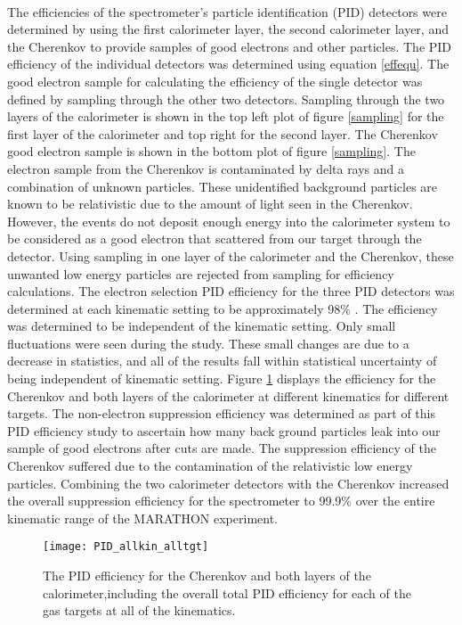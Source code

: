 \paragraph{}The efficiencies of the spectrometer's particle identification (PID) detectors were determined by using the first calorimeter layer, the second calorimeter layer, and the Cherenkov to provide samples of good electrons and other particles. The PID efficiency of the individual detectors was determined using equation \ref{effequ}. The good electron sample for calculating the efficiency of the single detector was defined by sampling through the other two detectors. Sampling through the two layers of the calorimeter is shown in the top left plot of figure \ref{sampling} for the first layer of the calorimeter and top right for the second layer. The Cherenkov good electron sample is shown in the bottom plot of figure \ref{sampling}. The electron sample from the Cherenkov is contaminated by delta rays and a combination of unknown particles. These unidentified background particles are known to be relativistic due to the amount of light seen in the Cherenkov. However, the events do not deposit enough energy into the calorimeter system to be considered as a good electron that scattered from our target through the detector. Using sampling in one layer of the calorimeter and the Cherenkov, these unwanted low energy particles are rejected from sampling for efficiency calculations. The electron selection PID efficiency for the three PID detectors was determined at each kinematic setting to be approximately 98$\%$ . The efficiency was determined to be independent of the kinematic setting. Only small fluctuations were seen during the study. These small changes are due to a decrease in statistics, and all of the results fall within statistical uncertainty of being independent of kinematic setting. Figure \ref{PID_eff} displays the efficiency for the Cherenkov and both layers of the calorimeter at different kinematics for different targets. The non-electron suppression efficiency was determined as part of this PID efficiency study to ascertain how many back ground particles leak into our sample of good electrons after cuts are made. The suppression efficiency of the Cherenkov suffered due to the contamination of the relativistic low energy particles. Combining the two calorimeter detectors with the Cherenkov increased the overall suppression efficiency for the spectrometer to 99.9$\%$ over the entire kinematic range of the MARATHON experiment. 

\begin{figure}[t]

	\centering
	\texttt{[image: PID\_allkin\_alltgt]}
	
	\caption{The PID efficiency for the Cherenkov and both layers of the calorimeter,including the overall total PID efficiency for each of the gas targets at all of the kinematics.\label{PID_eff}}
\end{figure}

